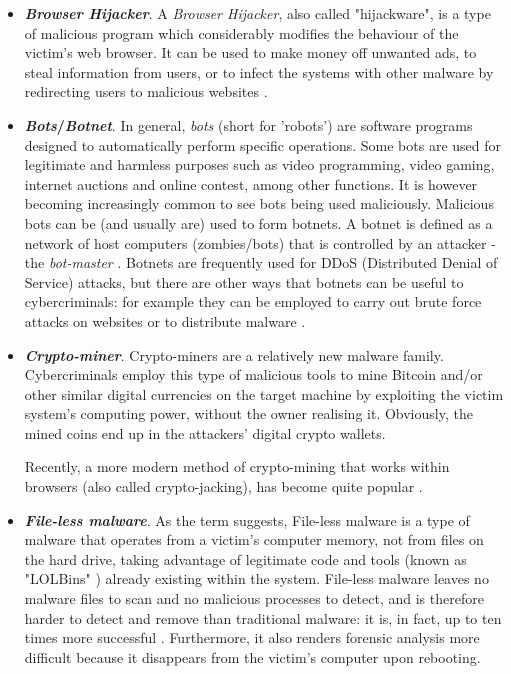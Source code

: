 \documentclass[pdfa%
,cucitura%
]{toptesi}
\begin{document}
\begin{itemize}
	\item \textbf{\textit{Browser Hijacker}}. A \textit{Browser Hijacker}, also called "hijackware", is a type of malicious program which considerably modifies the behaviour of the victim's web browser. It can be used to make money off unwanted ads, to steal information from users, or to infect the systems with other malware by redirecting users to malicious websites \cite{IngallsTOM}.	
	
	\item \textbf{\textit{Bots}/\textit{Botnet}}. In general, \textit{bots} (short for 'robots') are software programs designed to automatically perform specific operations. Some bots are used for legitimate and harmless purposes such as video programming, video gaming, internet auctions and online contest, among other functions. It is however becoming increasingly common to see bots being used maliciously. Malicious bots can be (and usually are) used to form botnets. A botnet is defined as a network of host computers (zombies/bots) that is controlled by an attacker - the \textit{bot-master} \cite{NamanyaTWM}. Botnets are frequently used for DDoS (Distributed Denial of Service) attacks, but there are other ways that botnets can be useful to cybercriminals: for example they can be employed to carry out brute force attacks on websites or to distribute malware \cite{CraneWIM}.
	
	\item \textbf{\textit{Crypto-miner}}. Crypto-miners are a relatively new malware family. Cybercriminals employ this type of malicious tools to mine Bitcoin and/or other similar digital currencies on the target machine by exploiting the victim system's computing power, without the owner realising it. Obviously, the mined coins end up in the attackers' digital crypto wallets.
	
	Recently, a more modern method of crypto-mining that works within browsers (also called crypto-jacking), has become quite popular \cite{MyraSecurityWIM}.
	
	\item \textbf{\textit{File-less malware}}. As the term suggests, File-less malware is a type of malware that operates from a victim's computer memory, not from files on the hard drive, taking advantage of legitimate code and tools (known as "LOLBins" \cite{CraneWIM}) already existing within the system. File-less malware leaves no malware files to scan and no malicious processes to detect, and is therefore harder to detect and remove than traditional malware: it is, in fact, up to ten times more successful \cite{BakerMCTM}. Furthermore, it also renders forensic analysis more difficult because it disappears from the victim's computer upon rebooting.
	

\end{itemize}
\end{document}

